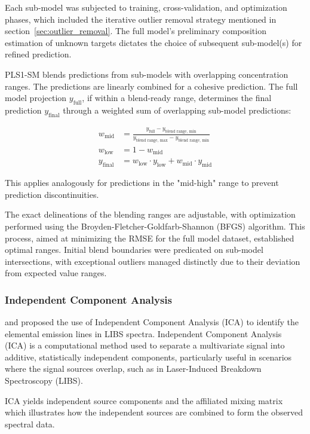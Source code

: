 Each sub-model was subjected to training, cross-validation, and optimization phases, which included the iterative outlier removal strategy mentioned in section~\ref{sec:outlier_removal}. The full model's preliminary composition estimation of unknown targets dictates the choice of subsequent sub-model(s) for refined prediction.

PLS1-SM blends predictions from sub-models with overlapping concentration ranges. The predictions are linearly combined for a cohesive prediction. The full model projection $y_{\text{full}}$, if within a blend-ready range, determines the final prediction $y_{\text{final}}$ through a weighted sum of overlapping sub-model predictions:

\begin{align*}
w_{\text{mid}} &= \frac{y_{\text{full}}-y_{\text{blend range, min}}}{y_{\text{blend range, max}} - y_{\text{blend range, min}}} \\
w_{\text{low}} &= 1 - w_{\text{mid}} \\
y_{\text{final}} &= w_{\text{low}}\cdot y_{\text{low}} + w_{\text{mid}}\cdot y_{\text{mid}} 
\end{align*}

This applies analogously for predictions in the "mid-high" range to prevent prediction discontinuities.

The exact delineations of the blending ranges are adjustable, with optimization performed using the Broyden-Fletcher-Goldfarb-Shannon (BFGS) algorithm. This process, aimed at minimizing the RMSE for the full model dataset, established optimal ranges. Initial blend boundaries were predicated on sub-model intersections, with exceptional outliers managed distinctly due to their deviation from expected value ranges.

\subsubsection{Independent Component Analysis}\label{sec:ica}
\citet{cleggRecalibrationMarsScience2017} and \cite{forniIndependentComponentAnalysis2013} proposed the use of Independent Component Analysis (ICA) to identify the elemental emission lines in LIBS spectra. Independent Component Analysis (ICA) is a computational method used to separate a multivariate signal into additive, statistically independent components, particularly useful in scenarios where the signal sources overlap, such as in Laser-Induced Breakdown Spectroscopy (LIBS).

ICA yields independent source components and the affiliated mixing matrix which illustrates how the independent sources are combined to form the observed spectral data.

